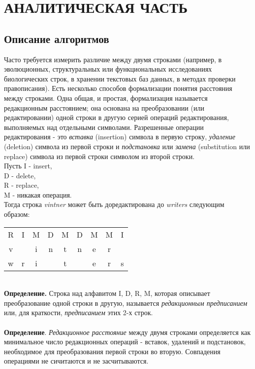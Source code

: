 \newpage
\section{АНАЛИТИЧЕСКАЯ ЧАСТЬ}
\subsection{Описание алгоритмов}

Часто требуется измерить различие между двумя строками (например, в эволюционных, структуральных или функциональных исследованиях биологических строк, в хранении текстовых баз данных, в методах проверки правописания). Есть несколько способов формализации понятия расстояния между строками. Одна общая, и простая, формализация называется редакционным расстоянием; она основана на преобразовании (или редактировании) одной строки в другую серией операций редактирования, выполняемых над отдельными символами. Разрешенные операции редактирования - это \textit{вставка} (insertion) символа в первую строку, \textit{удаление} (deletion) символа из первой строки и \textit{подстановка} или \textit{замена} (substitution или replace) символа из первой строки символом из второй строки. \\
Пусть I - insert, \\
D - delete, \\
R - replace, \\
M - никакая операция. \\
Тогда строка \textit{vintner} может быть доредактирована до \textit{writers} следующим образом: \\
\begin{table}[h]
\begin{center}
\begin{tabular}{ccccccccc}
R & I & M & D & M & D & M & M & I \\
v & & i & n & t & n & e & r & \\
w & r & i & & t & & e & r & s \\
\end{tabular}
\end{center}
\end{table}
\\
\textbf{Определение.} Строка над алфавитом I, D, R, M, которая описывает преобразование одной строки в другую, называется \textit{редакционным предписанием} или, для краткости, \textit{предписанием} этих 2-х строк. \\
\\
\textbf{Определение}. \textit{Редакционное расстояние} между двумя строками определяется как минимальное число редакционных операций - вставок, удалений и подстановок, необходимое для преобразования первой строки во вторую. Совпадения операциями не сичитаются и не засчитываются. \\
